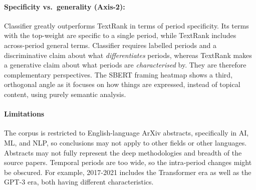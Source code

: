\documentclass[11pt]{article}
\begin{document}
\paragraph{Specificity vs.\ generality (Axis-2):}
Classifier greatly outperforms TextRank in terms of period specificity. Its terms with the top-weight are specific to a single period, while TextRank includes across-period general terms. Classifier requires labelled periods and a discriminative claim about what \emph{differentiates} periods, whereas TextRank makes a generative claim about what periods are \emph{characterised} by. They are therefore complementary perspectives. The SBERT framing heatmap shows a third, orthogonal angle as it focuses on how things are expressed, instead of topical content, using purely semantic analysis.

\paragraph{Limitations}
The corpus is restricted to English-language ArXiv abstracts, specifically in AI, ML, and NLP, so conclusions may not apply to other fields or other languages. Abstracts may not fully represent the deep methodologies and breadth of the source papers. Temporal periods are too wide, so the intra-period changes might be obscured. For example, 2017-2021 includes the Transformer era as well as the GPT-3 era, both having different characteristics.
\end{document}
